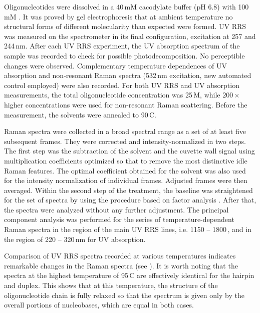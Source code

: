 Oligonucleotides were dissolved in a 40\,mM cacodylate buffer (pH 6.8) with
100\,mM .
It was proved by gel electrophoresis that at ambient temperature no structural
forms of different molecularity than expected were formed.
UV RRS was measured on the spectrometer in its final configuration, excitation
at 257 and 244\,nm.
After each UV RRS experiment, the UV absorption spectrum of the sample was
recorded to check for possible photodecomposition.
No perceptible changes were observed.
Complementary temperature dependences of UV absorption and non-resonant Raman
spectra (532\,nm excitation, new automated control employed) were also
recorded.
For both UV RRS and UV absorption measurements, the total oligonucleotide
concentration was 25\,M, while $200\times$ higher concentrations were used
for non-resonant Raman scattering.
Before the measurement, the solvents were annealed to 90\,\textdegree{}C.

Raman spectra were collected in a broad spectral range as a set of at least
five subsequent frames.
They were corrected and intensity-normalized in two steps.
The first step was the subtraction of the solvent and the cuvette wall signal
using multiplication coefficients optimized so that to remove the most
distinctive idle Raman features.
The optimal coefficient obtained for the solvent was also used for the
intensity normalization of individual frames.
Adjusted frames were then averaged.
Within the second step of the treatment, the baseline was straightened for the
set of spectra by using the procedure based on factor analysis
\parencite{Palacky2011}.
After that, the spectra were analyzed without any further adjustment.
The principal component analysis was performed for the series of
temperature-dependent Raman spectra in the region of the main UV RRS lines,
i.e. 1150 -- 1800\,\icm{}, and in the region of 220 -- 320\,nm for UV
absorption.

Comparison of UV RRS spectra recorded at various temperatures indicates
remarkable changes in the Raman spectra
(see ).
It is worth noting that the spectra at the highest temperature of
95\,\textdegree{}C are effectively identical for the hairpin and duplex.
This shows that at this temperature, the structure of the oligonucleotide chain
is fully relaxed so that the spectrum is given only by the overall portions of
nucleobases, which are equal in both cases.

\begin{figure}
	\centering
	\caption[%
		UV RRS spectra of DNA dodecamers measured at various temperatures.
	]{%
	}
	\label{\figlabel{dna_hairpins:spectra}}
\end{figure}

